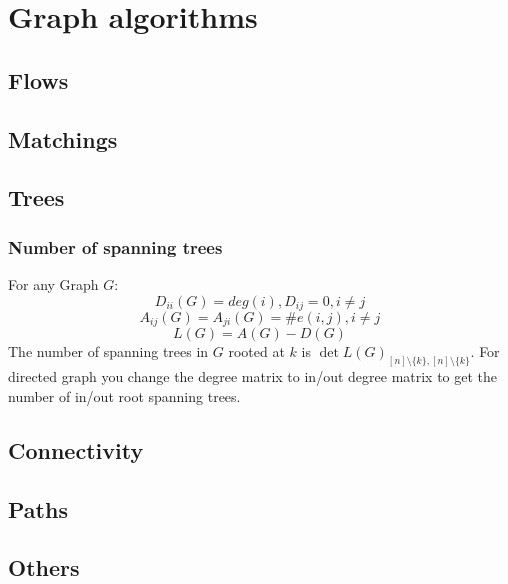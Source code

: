 \chapter{Graph algorithms}
\section{Flows}

\section{Matchings}

\section{Trees}

\subsection{Number of spanning trees}
For any Graph $G$:
$$
D_{ii}(G) = deg(i), D_{ij}=0,i \neq j
$$
$$
A_{ij}(G)=A_{ji}(G)= \#e(i,j), i \neq j
$$
$$
L(G)=A(G)-D(G)
$$
The number of spanning trees in $G$ rooted at $k$ is $\det L(G)_{[n] \setminus\{k\},[n] \setminus\{k\}}$.
For directed graph you change the degree matrix to in/out degree matrix to get the number of in/out root spanning trees.


\section{Connectivity}

\section{Paths}

\section{Others}
